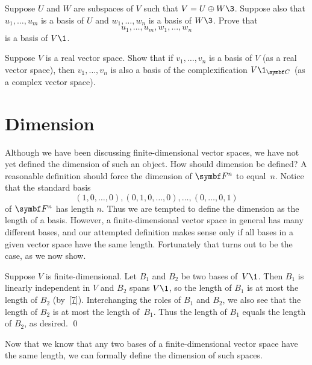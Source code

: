 \begin{exercises}
\exercise
Suppose $U$ and $W$ are subspaces of $V$ such that $V = U \oplus W\3$. Suppose also that $u_1, \dots, u_m$ is a basis of $U$ and $w_1, \dots, w_n$ is a basis of $W\3$. Prove that
\[
u_1, \dots, u_m, w_1, \dots, w_n
\]
is a basis of $V\1$.


\exercise
Suppose $V$ is a real vector space.
Show that if $v_1, \dots, v_n$ is a basis of $V$ (as a real vector space), then
$v_1, \dots, v_n$ is also a basis of the complexification $V\1_{\C{}}$ (as a complex vector space).


\end{exercises}

\section{Dimension} \label{dimension}

Although we have been discussing finite-dimensional vector spaces, we have not yet defined the dimension of such an object.  How should dimension be defined?  A reasonable definition should force the dimension of $\F{n}$ to equal~$n$.  Notice that the standard basis
\[
(1, 0, \dots, 0), (0, 1, 0, \dots, 0), \dots, (0, \dots, 0, 1)
\]
of $\F{n}$ has length $n$.  Thus we are tempted to define the dimension as the length of a
basis.  However, a finite-dimensional vector space in general has many
different bases, and our attempted definition makes sense only if all bases in a
given vector space have the same length.  Fortunately that turns out to be the
case, as we now show.


\proof
Suppose $V$ is finite-dimensional.  Let $B_1$ and $B_2$ be two bases
of~$V\1$.  Then $B_1$ is linearly independent in $V$ and $B_2$ spans $V\1$, so the
length of $B_1$ is at most the length of $B_2$ (by~\ref{7}).  Interchanging
the roles of $B_1$ and $B_2$, we also see that the length of $B_2$ is
at most the length of~$B_1$.  Thus the length of $B_1$ equals the
length of $B_2$, as desired.  \qed

Now that we know that any two bases of a finite-dimensional vector space have  the same length, we can  formally define the dimension of such spaces.


